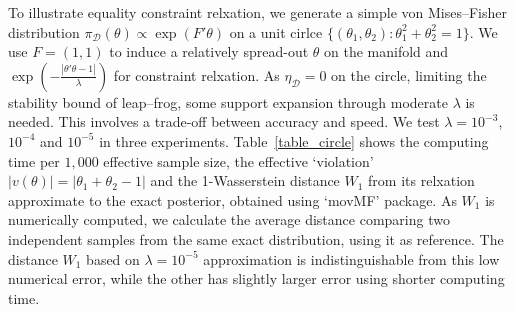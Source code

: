 \documentclass[10pt]{article}
\newcommand{\mc}[1]{\mathcal{#1}}
\DeclareMathOperator{\1}{\mathbbm{1}}
\begin{document}
To illustrate equality constraint relxation, we generate a simple von Mises--Fisher distribution $\pi_{\mc D}(\theta) \propto \exp(F'\theta)$ on a unit cirlce $\{(\theta_1,\theta_2):\theta_1^2+\theta_2^2=1\}$. We use $F=(1,1)$ to induce a relatively spread-out  $\theta$ on the manifold and $\exp(-\frac{|\theta'\theta -1|}{\lambda})$ for constraint relxation. As $\eta_{\mc D}=0$ on the circle, limiting the stability bound of leap--frog, some support expansion through moderate $\lambda$ is needed. This involves a trade-off between accuracy and speed. We test $\lambda = 10^{-3}$, $10^{-4}$ and $10^{-5}$ in three experiments. 
Table~\ref{table_circle} shows the computing time per $1,000$ effective sample size, the effective `violation' $|v(\theta)|=|\theta_1+\theta_2-1|$ and the 1-Wasserstein distance $W_1$ from its relxation approximate to the exact posterior, obtained using `movMF' package. As $W_1$ is numerically computed, we calculate the average distance comparing two independent samples from the same exact distribution, using it as reference. The distance $W_1$ based on $\lambda= 10^{-5}$ approximation is indistinguishable from this low numerical error, while the other has slightly larger error using shorter computing time.

\end{document}
